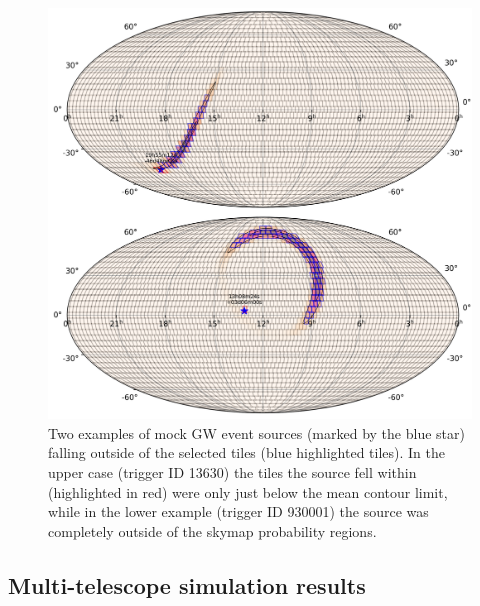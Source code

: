 \begin{colsection}
\begin{colsection}
\begin{figure}[p]
    \begin{center}
        \includegraphics[width=\linewidth]{images/non_selected.pdf}
    \end{center}
    \caption[Examples of mock GW event sources falling outside of the selected tiles]{
        Two examples of mock GW event sources (marked by the blue star) falling outside of the selected tiles (blue highlighted tiles). In the upper case (trigger ID 13630) the tiles the source fell within (highlighted in red) were only just below the mean contour limit, while in the lower example (trigger ID 930001) the source was completely outside of the skymap probability regions.
    }\label{fig:poor_selection}
\end{figure}

\clearpage

\end{colsection}


\subsection{Multi-telescope simulation results}
\label{sec:gw_sim_results}
\begin{colsection}


\end{colsection}
\end{colsection}
